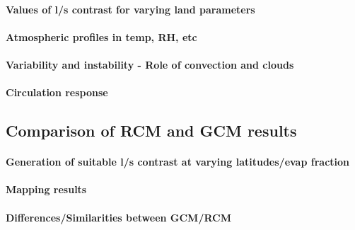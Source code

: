 \paragraph{Values of l/s contrast for varying land parameters}
\paragraph{Atmospheric profiles in temp, RH, etc}
\paragraph{Variability and instability - Role of convection and clouds}
\paragraph{Circulation response}

\subsection{Comparison of RCM and GCM results}

\paragraph{Generation of suitable l/s contrast at varying latitudes/evap fraction}
\paragraph{Mapping results}
\paragraph{Differences/Similarities between GCM/RCM}



